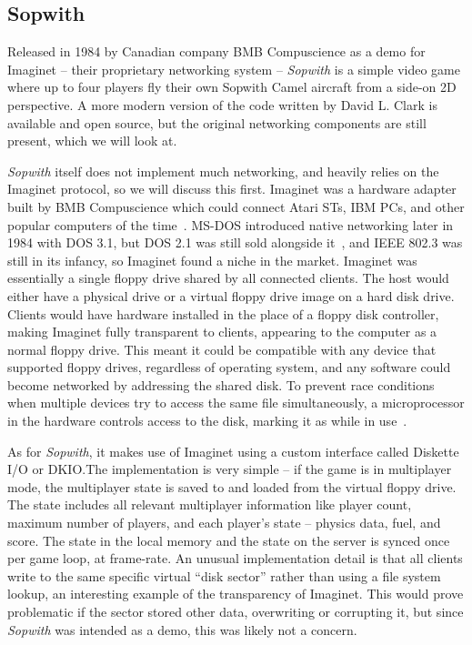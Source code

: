 \subsection{Sopwith}\label{subsec:sopwith}

Released in 1984 by Canadian company BMB Compuscience as a demo for Imaginet -- their proprietary networking system -- \textit{Sopwith} is a simple video game where up to four players fly their own Sopwith Camel aircraft from a side-on 2D perspective. A more modern version of the code written by David L. Clark is available and open source, but the original networking components are still present, which we will look at.

\textit{Sopwith} itself does not implement much networking, and heavily relies on the Imaginet protocol, so we will discuss this first. Imaginet was a hardware adapter built by BMB Compuscience which could connect Atari STs, IBM PCs, and other popular computers of the time~\cite{colead}. MS-DOS introduced native networking later in 1984 with DOS 3.1, but DOS 2.1 was still sold alongside it~\cite{dosonline}, and IEEE 802.3 was still in its infancy, so Imaginet found a niche in the market. Imaginet was essentially a single floppy drive shared by all connected clients. The host would either have a physical drive or a virtual floppy drive image on a hard disk drive. Clients would have hardware installed in the place of a floppy disk controller, making Imaginet fully transparent to clients, appearing to the computer as a normal floppy drive. This meant it could be compatible with any device that supported floppy drives, regardless of operating system, and any software could become networked by addressing the shared disk. To prevent race conditions when multiple devices try to access the same file simultaneously, a microprocessor in the hardware controls access to the disk, marking it as  while in use~\cite{imaginetpatent}.

As for \textit{Sopwith}, it makes use of Imaginet using a custom interface called Diskette I/O or DKIO.\@ The implementation is very simple -- if the game is in multiplayer mode, the multiplayer state is saved to and loaded from the virtual floppy drive. The state includes all relevant multiplayer information like player count, maximum number of players, and each player's state -- physics data, fuel, and score. The state in the local memory and the state on the server is synced once per game loop, \ie{} at frame-rate. An unusual implementation detail is that all clients write to the same specific virtual ``disk sector'' rather than using a file system lookup, an interesting example of the transparency of Imaginet. This would prove problematic if the sector stored other data, overwriting or corrupting it, but since \textit{Sopwith} was intended as a demo, this was likely not a concern.

